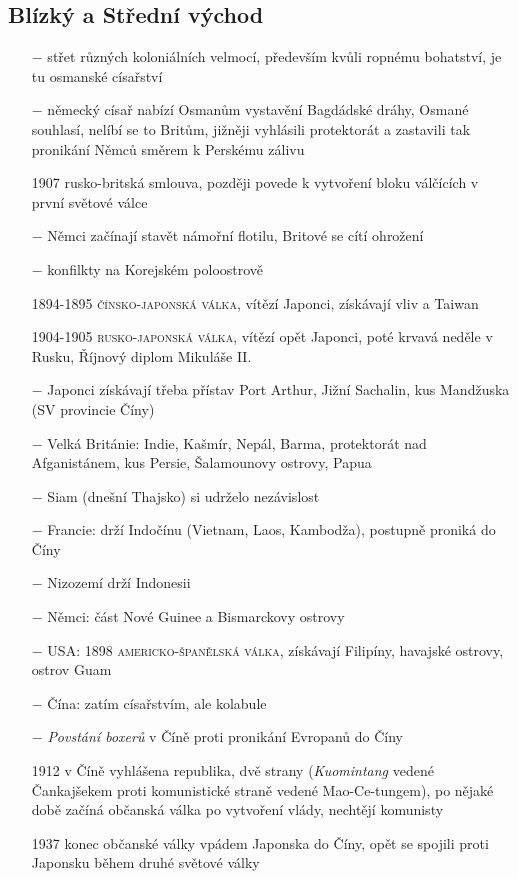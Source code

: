 \documentclass{article}
\begin{document}
\subsection*{Blízký a Střední východ}
\begin{itemize}
    \vspace{-0.5em}
    \setlength\itemsep{0.15em}
    \item[$-$] střet různých koloniálních velmocí, především kvůli ropnému bohatství, je tu osmanské císařství
    \item[$-$] německý císař nabízí Osmanům vystavění Bagdádské dráhy, Osmané souhlasí, nelíbí se to Britům, jižněji vyhlásili protektorát a zastavili tak pronikání Němců směrem k Perskému zálivu
    \item[1907] rusko-britská smlouva, později povede k vytvoření bloku válčících v první světové válce
    \item[$-$] Němci začínají stavět námořní flotilu, Britové se cítí ohrožení
    \item[$-$] konfilkty na Korejském poloostrově
    \item[1894-1895] \textsc{čínsko-japonská válka}, vítězí Japonci, získávají vliv a Taiwan
    \item[1904-1905] \textsc{rusko-japonská válka}, vítězí opět Japonci, poté krvavá neděle v Rusku, Říjnový diplom Mikuláše II.
    \item[$-$] Japonci získávají třeba přístav Port Arthur, Jižní Sachalin, kus Mandžuska (SV provincie Číny)
    \item[$-$] Velká Británie: Indie, Kašmír, Nepál, Barma, protektorát nad Afganistánem, kus Persie, Šalamounovy ostrovy, Papua
    \item[$-$] Siam (dnešní Thajsko) si udrželo nezávislost
    \item[$-$] Francie: drží Indočínu (Vietnam, Laos, Kambodža), postupně proniká do Číny
    \item[$-$] Nizozemí drží Indonesii
    \item[$-$] Němci: část Nové Guinee a Bismarckovy ostrovy
    \item[$-$] USA: 1898 \textsc{americko-španělská válka}, získávají Filipíny, havajské ostrovy, ostrov Guam
    \item[$-$] Čína: zatím císařstvím, ale kolabule
    \item[$-$] \textit{Povstání boxerů} v Číně proti pronikání Evropanů do Číny
    \item[1912] v Číně vyhlášena republika, dvě strany (\textit{Kuomintang} vedené Čankajšekem proti komunistické straně vedené Mao-Ce-tungem), po nějaké době začíná občanská válka po vytvoření vlády, nechtějí komunisty
    \item[1937] konec občanské války vpádem Japonska do Číny, opět se spojili proti Japonsku během druhé světové války
\end{itemize}
\end{document}
